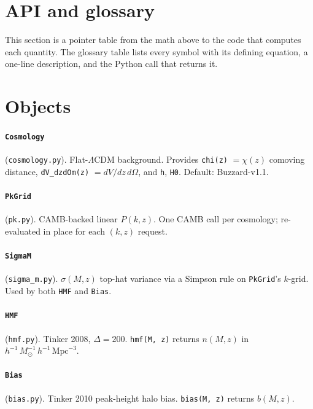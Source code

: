 \documentclass[a4paper, 11pt]{article}
\newcommand{\hMpc}{h^{-1}\,\mathrm{Mpc}}
\newcommand{\hMsun}{h^{-1}\,M_{\odot}}
\begin{document}
\clearpage
\section*{\textcolor{harvardcrimson}{API and glossary}}
\label{part:api}

This section is a pointer table from the math above to the code
that computes each quantity. The glossary table lists every
symbol with its defining equation, a one-line description, and
the Python call that returns it.

\section{Objects}

\paragraph{\texttt{Cosmology}} (\texttt{cosmology.py}).
Flat-\(\Lambda\)CDM background. Provides
\texttt{chi(z)} \(=\chi(z)\) comoving distance,
\texttt{dV\_dzdOm(z)} \(= dV/dz\,d\Omega\), and \texttt{h}, \texttt{H0}.
Default: Buzzard-v1.1.

\paragraph{\texttt{PkGrid}} (\texttt{pk.py}).
CAMB-backed linear \(P(k,z)\). One CAMB call per cosmology;
re-evaluated in place for each \((k,z)\) request.

\paragraph{\texttt{SigmaM}} (\texttt{sigma\_m.py}).
\(\sigma(M,z)\) top-hat variance via a Simpson rule on
\texttt{PkGrid}'s \(k\)-grid. Used by both \texttt{HMF} and
\texttt{Bias}.

\paragraph{\texttt{HMF}} (\texttt{hmf.py}).
Tinker 2008, \(\Delta=200\). \texttt{hmf(M, z)} returns
\(n(M,z)\) in \(\hMsun^{-1}\,\hMpc^{-3}\).

\paragraph{\texttt{Bias}} (\texttt{bias.py}).
Tinker 2010 peak-height halo bias. \texttt{bias(M, z)} returns
\(b(M,z)\).
\end{document}
